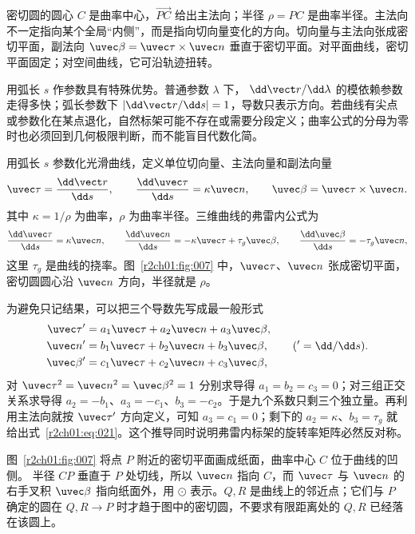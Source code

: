密切圆的圆心 $C$ 是曲率中心，$\overrightarrow{PC}$ 给出主法向；半径 $\rho=PC$ 是曲率半径。主法向不一定指向某个全局“内侧”，而是指向切向量变化的方向。切向量与主法向张成密切平面，副法向 $\uvec\beta=\uvec\tau\times\uvec n$ 垂直于密切平面。对平面曲线，密切平面固定；对空间曲线，它可沿轨迹扭转。

用弧长 $s$ 作参数具有特殊优势。普通参数 $\lambda$ 下，
$\dd\vect r/\dd\lambda$ 的模依赖参数走得多快；弧长参数下
$|\dd\vect r/\dd s|=1$，导数只表示方向。若曲线有尖点或参数化在某点退化，自然标架可能不存在或需要分段定义；曲率公式的分母为零时也必须回到几何极限判断，而不能盲目代数化简。

用弧长 $s$ 参数化光滑曲线，定义单位切向量、主法向量和副法向量
\begin{equation}
  \uvec\tau=\frac{\dd\vect r}{\dd s},\qquad
  \frac{\dd\uvec\tau}{\dd s}=\kappa\uvec n,\qquad
  \uvec\beta=\uvec\tau\times\uvec n.
  \label{r2ch01:eq:020}
\end{equation}
其中 $\kappa=1/\rho$ 为曲率，$\rho$ 为曲率半径。三维曲线的弗雷内公式为
\begin{equation}
  \frac{\dd\uvec\tau}{\dd s}=\kappa\uvec n,\qquad
  \frac{\dd\uvec n}{\dd s}=-\kappa\uvec\tau+\tau_g\uvec\beta,\qquad
  \frac{\dd\uvec\beta}{\dd s}=-\tau_g\uvec n,
  \label{r2ch01:eq:021}
\end{equation}
这里 $\tau_g$ 是曲线的挠率。图~\ref{r2ch01:fig:007} 中，$\uvec\tau$、$\uvec n$ 张成密切平面，密切圆圆心沿 $\uvec n$ 方向，半径就是 $\rho$。

为避免只记结果，可以把三个导数先写成最一般形式
\[
\begin{aligned}
  \uvec\tau'&=a_1\uvec\tau+a_2\uvec n+a_3\uvec\beta,\\
  \uvec n'&=b_1\uvec\tau+b_2\uvec n+b_3\uvec\beta,\\
  \uvec\beta'&=c_1\uvec\tau+c_2\uvec n+c_3\uvec\beta,
\end{aligned}
\qquad({}'=\dd/\dd s).
\]
对 $\uvec\tau^2=\uvec n^2=\uvec\beta^2=1$ 分别求导得 $a_1=b_2=c_3=0$；对三组正交关系求导得
$a_2=-b_1$、$a_3=-c_1$、$b_3=-c_2$。于是九个系数只剩三个独立量。再利用主法向就按 $\uvec\tau'$ 方向定义，可知 $a_3=c_1=0$；剩下的 $a_2=\kappa$、$b_3=\tau_g$ 就给出式~\eqref{r2ch01:eq:021}。这个推导同时说明弗雷内标架的旋转率矩阵必然反对称。

\figFrenet

图~\ref{r2ch01:fig:007} 将点 $P$ 附近的密切平面画成纸面，曲率中心 $C$ 位于曲线的凹侧。
半径 $CP$ 垂直于 $P$ 处切线，所以 $\uvec n$ 指向 $C$，而 $\uvec\tau$ 与 $\uvec n$ 的右手叉积
$\uvec\beta$ 指向纸面外，用 $\odot$ 表示。$Q,R$ 是曲线上的邻近点；它们与 $P$ 确定的圆在
$Q,R\to P$ 时才趋于图中的密切圆，不要求有限距离处的 $Q,R$ 已经落在该圆上。

